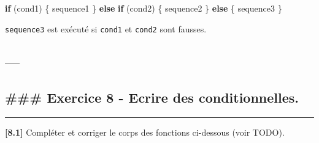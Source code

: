 \documentclass[11pt]{article}
\newenvironment{Shaded}{}{}
\newcommand{\NormalTok}[1]{{#1}}
\newcommand{\ControlFlowTok}[1]{\textcolor[rgb]{0.00,0.44,0.13}{\textbf{{#1}}}}
\begin{document}
\begin{Shaded}
\begin{Highlighting}[]
\ControlFlowTok{if}\NormalTok{ (cond1) \{}
\NormalTok{    sequence1}
\NormalTok{\} }\ControlFlowTok{else} \ControlFlowTok{if}\NormalTok{ (cond2) \{}
\NormalTok{    sequence2}
\NormalTok{\} }\ControlFlowTok{else}\NormalTok{ \{}
\NormalTok{    sequence3}
\NormalTok{\}}
\end{Highlighting}
\end{Shaded}

\texttt{sequence3} est exécuté si \texttt{cond1} et \texttt{cond2} sont
fausses.

    \hypertarget{section}{%
\subsection{---}\label{section}}

\hypertarget{exercice-8---ecrire-des-conditionnelles.}{%
\subsection{\#\#\# Exercice 8 - Ecrire des
conditionnelles.}\label{exercice-8---ecrire-des-conditionnelles.}}

\begin{center}\rule{0.5\linewidth}{0.5pt}\end{center}

\textbf{{[}8.1{]}} Compléter et corriger le corps des fonctions
ci-dessous (voir TODO).
\end{document}
